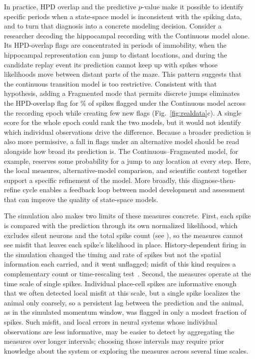 \documentclass[12pt]{article}
\begin{document}
In practice, HPD overlap and the predictive $p$-value make it possible to identify specific periods when a state-space model is inconsistent with the spiking data, and to turn that diagnosis into a concrete modeling decision. Consider a researcher decoding the hippocampal recording with the Continuous model alone. Its HPD-overlap flags are concentrated in periods of immobility, when the hippocampal representation can jump to distant locations, and during the candidate replay event its prediction cannot keep up with spikes whose likelihoods move between distant parts of the maze. This pattern suggests that the continuous transition model is too restrictive. Consistent with that hypothesis, adding a Fragmented mode that permits discrete jumps eliminates the HPD-overlap flag for \RecHpdRescuedPercent\% of spikes flagged under the Continuous model across the recording epoch while creating few new flags (Fig.~\ref{fig:realdata}c). A single score for the whole epoch could rank the two models, but it would not identify which individual observations drive the difference. Because a broader prediction is also more permissive, a fall in flags under an alternative model should be read alongside how broad its prediction is. The Continuous--Fragmented model, for example, reserves some probability for a jump to any location at every step. Here, the local measures, alternative-model comparison, and scientific context together support a specific refinement of the model. More broadly, this diagnose-then-refine cycle enables a feedback loop between model development and assessment that can improve the quality of state-space models.

The simulation also makes two limits of these measures concrete. First, each spike is compared with the prediction through its own normalized likelihood, which excludes silent neurons and the total spike count (see ), so the measures cannot see misfit that leaves each spike's likelihood in place. History-dependent firing in the simulation changed the timing and rate of spikes but not the spatial information each carried, and it went unflagged; misfit of this kind requires a complementary count or time-rescaling test~\cite{BrownTimeRescalingTheorem2002,Taocommongoodnessoffitframework2018}. Second, the measures operate at the time scale of single spikes. Individual place-cell spikes are informative enough that we often detected local misfit at this scale, but a single spike localizes the animal only coarsely, so a persistent lag between the prediction and the animal, as in the simulated momentum window, was flagged in only a modest fraction of spikes. Such misfit, and local errors in neural systems whose individual observations are less informative, may be easier to detect by aggregating the measures over longer intervals; choosing those intervals may require prior knowledge about the system or exploring the measures across several time scales.
\end{document}
